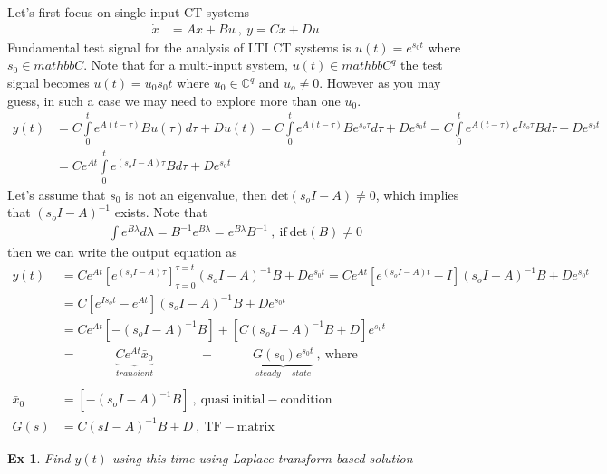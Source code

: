 \documentclass[twoside]{article}
\newtheorem{exmp}[theorem]{Ex}
\begin{document}
Let's first focus on single-input CT systems 
%
\begin{align*}
       \dot{x} &= A x + B u \ , \ y = C x + D u
\end{align*}
%
Fundamental test signal for the analysis of LTI CT systems is $u(t) = e^{s_0 t}$ where $s_0 \in mathbb{C}$. Note that for a multi-input system, $u(t) \in mathbb{C}^q$ the test signal becomes $u(t) = u_0 s_0 t$ where $u_0 \in \mathbb{C}^q$ and $u_o \neq 0$. However as you may guess, in such a case we may need to explore more than one $u_0$.
%
\begin{align*}
  y(t) &= C \int\limits_{0}^{t} e^{A ( t - \tau ) } B u(\tau) d \tau + D u(t) = C \int\limits_{0}^{t} e^{A ( t - \tau ) } B e^{s_o \tau} d \tau + D e^{s_0 t} = 
  C \int\limits_{0}^{t} e^{A ( t - \tau ) } e^{I   s_o \tau} B d \tau + D e^{s_0 t}
  \\
  &=   C e^{A t} \int\limits_{0}^{t} e^{(s_o I - A)  \tau} B d \tau + D e^{s_0 t}
\end{align*}
%
Let's assume that $s_0$ is not an eigenvalue, then $\mathrm{det}(s_o I - A) \neq 0$, which implies that $(s_o I - A)^{-1}$ exists. Note that
%
\begin{align*}
\int e^{B \lambda} d \lambda = B^{-1} e^{B \lambda} = e^{B \lambda} B^{-1} \ , \ \mathrm{if} \ \mathrm{det}(B) \neq 0
\end{align*}
%
then we can write the output equation as
\begin{align*}
  y(t) &= C e^{A t} \left[ e^{(s_o I - A)  \tau} \right]_{\tau = 0}^{\tau = t} (s_o I - A)^{-1} B + D e^{s_0 t}
  = C e^{A t} \left[ e^{(s_o I - A)  t} - I \right] (s_o I - A)^{-1} B + D e^{s_0 t}
  \\
  &= C \left[ e^{I s_o t} - e^{A t} \right] (s_o I - A)^{-1} B + D e^{s_0 t} 
  \\
  &=  C e^{A t} \left[ - (s_o I - A)^{-1} B \right] +
  \left[ C (s_o I - A)^{-1} B + D \right] e^{s_0 t}
  \\
  &= \quad \quad  \quad  \underbrace{C e^{A t} \bar{x}_0}_{transient}  \quad \quad \quad \ \ \, +
   \quad \quad \quad \underbrace{G(s_0) e^{s_0 t}}_{steady-state} \ , \ \mathrm{where}
   \\
   \\
   \bar{x}_0 &=  \left[ - (s_o I - A)^{-1} B \right] \ , \ \mathrm{quasi} \ \mathrm{initial-condition}
   \\
   G(s) &= C (s I - A)^{-1} B + D \ , \ \mathrm{TF-matrix} 
\end{align*}

\begin{exmp}
 Find $y(t)$ using this time using Laplace transform based solution 
\end{exmp}
\end{document}
